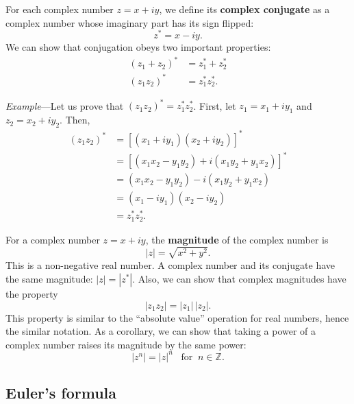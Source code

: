 \documentclass[10pt,a4paper]{article}
\begin{document}
For each complex number $z = x + iy$, we define its \textbf{complex
conjugate} as a complex number whose imaginary part has its sign
flipped:
\begin{equation}
z^* = x - i y.
\end{equation}
We can show that conjugation obeys two important properties:
\begin{equation}
\begin{aligned}(z_1 + z_2)^* &= z_1^* + z_2^* \\ (z_1 z_2)^* &= z_1^* z_2^*.\end{aligned}
\end{equation}

\begin{framed} \noindent
\textit{Example}---Let us prove that $(z_1 z_2)^* = z_1^* z_2^*$. First, let
$z_1 = x_1 + i y_1$ and $z_2 = x_2 + i y_2$.
Then,
\begin{align*}(z_1 z_2)^* &= \left[(x_1+iy_1)(x_2+iy_2)\right]^* \\ &= \left[\left(x_1 x_2 - y_1 y_2\right) + i\left(x_1y_2+y_1x_2\right)\right]^* \\ &= \left(x_1 x_2 - y_1 y_2\right) - i\left(x_1y_2+y_1x_2\right) \\ &= \left(x_1 - i y_1\right)\left(x_2 - i y_2\right) \\&= z_1^* z_2^*. \end{align*}
\end{framed}

For a complex number $z = x + i y$, the \textbf{magnitude} of the
complex number is
\begin{equation}
|z| = \sqrt{x^2 + y^2}.
\end{equation}
This is a non-negative real number. A complex number and its conjugate
have the same magnitude: $|z| = |z^*|$. Also, we can show that complex
magnitudes have the property
\begin{equation}
|z_1 z_2| = |z_1| \, |z_2|.
\end{equation}
This property is similar to the ``absolute value'' operation for real
numbers, hence the similar notation. As a corollary, we can show that
taking a power of a complex number raises its magnitude by the same
power:
\begin{equation}
|z^n| = |z|^n \;\;\;\textrm{for}\;\;n \in \mathbb{Z}.
\end{equation}

\subsection{Euler's formula}\label{eulers-formula}
\end{document}
